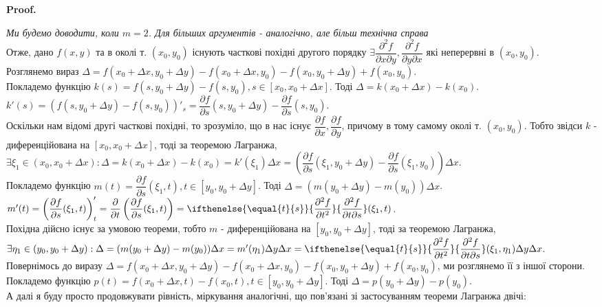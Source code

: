 \documentclass[a4paper, 10pt]{article}
\makeatletter
\def\departial#1#2{\dfrac{\partial {#1}}{\partial {#2}}}
\def\seconddepartial#1#2#3{\ifthenelse{\equal{#2}{#3}}{\dfrac{\partial^2 {#1}}{\partial {#2}^2}}{\dfrac{\partial^2 {#1}}{\partial {#2} \partial {#3}}}}
\def\qed{$\blacksquare$}
\theoremstyle{theoremdd}
\theoremstyle{theoremdd}
\theoremstyle{theoremdd}
\theoremstyle{theoremdd}
\theoremstyle{theoremdd}
\theoremstyle{theoremdd}
\theoremstyle{theoremdd}
\theoremstyle{theoremdd}
\renewenvironment{proof}[1][Proof.\\]{\par
\pushQED{\hfill \qed}%
\normalfont \topsep6\p@\@plus6\p@\relax
\trivlist
\item\relax
{\bfseries
#1\@addpunct{.}}\hspace\labelsep\ignorespaces
}{%
\popQED\endtrivlist\@endpefalse
}
\makeatother
\begin{document}
\begin{proof}
\textit{Ми будемо доводити, коли $m = 2$. Для більших аргументів - аналогічно, але більш технічна справа}
\bigskip \\
Отже, дано $f(x,y)$ та в околі т. $(x_0,y_0)$ існують часткові похідні другого порядку $\exists \dfrac{\partial^2 f}{\partial x \partial y}, \dfrac{\partial^2 f}{\partial y \partial x}$ які неперервні в $(x_0,y_0)$.\\
Розглянемо вираз $\Delta = f(x_0+\Delta x, y_0+\Delta y) - f(x_0+\Delta x,y_0) - f(x_0,y_0+\Delta y) + f(x_0,y_0)$.\\
Покладемо функцію $k(s) = f(s,y_0+\Delta y) - f(s,y_0), s \in [x_0,x_0+\Delta x]$. Тоді $\Delta = k(x_0+\Delta x) - k(x_0)$.\\
$k'(s) = (f(s,y_0+\Delta y) - f(s,y_0))'_s = \departial{f}{s}(s,y_0+\Delta y) - \departial{f}{s}(s,y_0)$.\\
Оскільки нам відомі другі часткові похідні, то зрозуміло, що в нас існує $\departial{f}{x}, \departial{f}{y}$, причому в тому самому околі т. $(x_0,y_0)$. Тобто звідси $k$ - диференційована на $[x_0, x_0+\Delta x]$, тоді за теоремою Лагранжа, $\exists \xi_1 \in (x_0,x_0+\Delta x): \Delta = k(x_0+\Delta x) - k(x_0) = k'(\xi_1) \Delta x = \left( \departial{f}{s}(\xi_1,y_0+\Delta y) - \departial{f}{s}(\xi_1,y_0) \right) \Delta x$.\\
Покладемо функцію $m(t) = \departial{f}{s}(\xi_1,t), t \in [y_0,y_0+\Delta y]$. Тоді $\Delta = (m(y_0+\Delta y) - m(y_0)) \Delta x$.\\
$m'(t) = \left( \departial{f}{s}(\xi_1,t) \right)'_t = \departial{}{t}\left( \departial{f}{s}(\xi_1,t) \right) = \seconddepartial{f}{t}{s}(\xi_1,t)$.\\
Похідна дійсно існує за умовою теореми, тобто $m$ - диференційована на $[y_0,y_0+\Delta y]$, тоді за теоремою Лагранжа, $\exists \eta_1 \in (y_0,y_0+\Delta y): \Delta = (m(y_0+\Delta y)-m(y_0)) \Delta x = m'(\eta_1) \Delta y \Delta x = \seconddepartial{f}{t}{s}(\xi_1,\eta_1) \Delta y \Delta x$.
\bigskip \\
Повернімось до виразу $\Delta = f(x_0+\Delta x, y_0+\Delta y) - f(x_0+\Delta x,y_0) - f(x_0,y_0+\Delta y) + f(x_0,y_0)$, ми розглянемо її з іншої сторони.\\
Покладемо функцію $p(t) = f(x_0+\Delta x,t) - f(x_0,t), t \in [y_0,y_0+\Delta y]$. Тоді $\Delta = p(y_0+\Delta y) - p(y_0)$.\\
А далі я буду просто продовжувати рівність, міркування аналогічні, що пов'язані зі застосуванням теореми Лагранжа двічі:\\

\end{proof}
\end{document}
